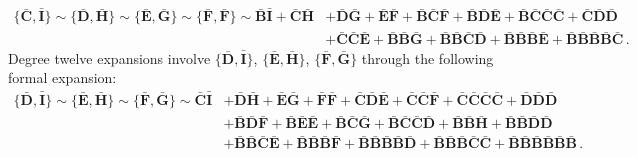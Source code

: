 \documentclass[10pt]{amsart}
\theoremstyle{definition}
\theoremstyle{corollary}
\theoremstyle{remark}
\theoremstyle{conclusion}
\begin{document}
\begin{align}
	\{\bar{\mathbf{C}}, \bar{\mathbf{I}}\} \sim \{\bar{\mathbf{D}}, \bar{\mathbf{H}}\}\sim \{\bar{\mathbf{E}},\bar{ \mathbf{G}}\}  \sim \{\bar{\mathbf{F}},\bar{ \mathbf{F}}\}  \sim \bar{\mathbf{B}}\bar{\mathbf{I}}+\bar{\mathbf{C}}\bar{\mathbf{H}}&+\bar{\mathbf{D}}\bar{\mathbf{G}}+\bar{\mathbf{E}}\bar{\mathbf{F}}+\bar{\mathbf{B}}\bar{\mathbf{C}}\bar{\mathbf{F}}+\bar{\mathbf{B}}\bar{\mathbf{D}}\bar{\mathbf{E}}+\bar{\mathbf{B}}\bar{\mathbf{C}}\bar{\mathbf{C}}\bar{\mathbf{C}}+\bar{\mathbf{C}}\bar{\mathbf{D}}\bar{\mathbf{D}} \nonumber \\
	&+\bar{\mathbf{C}}\bar{\mathbf{C}}\bar{\mathbf{E}}+\bar{\mathbf{B}}\bar{\mathbf{B}}\bar{\mathbf{G}}+\bar{\mathbf{B}}\bar{\mathbf{B}}\bar{\mathbf{C}}\bar{\mathbf{D}}+\bar{\mathbf{B}}\bar{\mathbf{B}}\bar{\mathbf{B}}\bar{\mathbf{E}}+\bar{\mathbf{B}}\bar{\mathbf{B}}\bar{\mathbf{B}}\bar{\mathbf{B}}\bar{\mathbf{C}}\, .
	\label{deg11b}
\end{align}
  Degree twelve expansions involve $\{\bar{\mathbf{D}},\bar{\mathbf{I}} \}$,  $\{\bar{\mathbf{E}},\bar{\mathbf{H}} \}$, $\{\bar{\mathbf{F}},\bar{\mathbf{G}} \}$  through the following formal expansion:
\begin{align}
	\{\bar{\mathbf{D}}, \bar{\mathbf{I}}\} \sim \{\bar{\mathbf{E}}, \bar{\mathbf{H}}\}\sim \{\bar{\mathbf{F}},\bar{ \mathbf{G}}\}   \sim \bar{\mathbf{C}}\bar{\mathbf{I}}&+\bar{\mathbf{D}}\bar{\mathbf{H}}+\bar{\mathbf{E}}\bar{\mathbf{G}}+\bar{\mathbf{F}}\bar{\mathbf{F}}+\bar{\mathbf{C}}\bar{\mathbf{D}}\bar{\mathbf{E}}+\bar{\mathbf{C}}\bar{\mathbf{C}}\bar{\mathbf{F}}+\bar{\mathbf{C}}\bar{\mathbf{C}}\bar{\mathbf{C}}\bar{\mathbf{C}}+\bar{\mathbf{D}}\bar{\mathbf{D}}\bar{\mathbf{D}} \nonumber \\
	&+\bar{\mathbf{B}}\bar{\mathbf{D}}\bar{\mathbf{F}}+\bar{\mathbf{B}}\bar{\mathbf{E}}\bar{\mathbf{E}}+\bar{\mathbf{B}}\bar{\mathbf{C}}\bar{\mathbf{G}}+\bar{\mathbf{B}}\bar{\mathbf{C}}\bar{\mathbf{C}}\bar{\mathbf{D}}+\bar{\mathbf{B}}\bar{\mathbf{B}}\bar{\mathbf{H}}+\bar{\mathbf{B}}\bar{\mathbf{B}}\bar{\mathbf{D}}\bar{\mathbf{D}} \nonumber\\
	&+\bar{\mathbf{B}}\bar{\mathbf{B}}\bar{\mathbf{C}}\bar{\mathbf{E}}+\bar{\mathbf{B}}\bar{\mathbf{B}}\bar{\mathbf{B}}\bar{\mathbf{F}}+\bar{\mathbf{B}}\bar{\mathbf{B}}\bar{\mathbf{B}}\bar{\mathbf{B}}\bar{\mathbf{D}}+\bar{\mathbf{B}}\bar{\mathbf{B}}\bar{\mathbf{B}}\bar{\mathbf{C}}\bar{\mathbf{C}}+\bar{\mathbf{B}}\bar{\mathbf{B}}\bar{\mathbf{B}}\bar{\mathbf{B}}\bar{\mathbf{B}}\bar{\mathbf{B}}\, .
	\label{deg12b}
\end{align}
\end{document}
